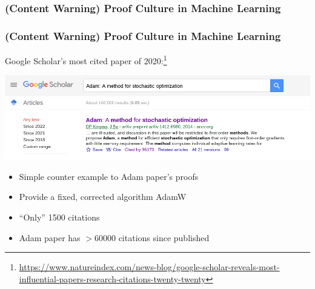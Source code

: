 \begin{frame}
\frametitle{(Content Warning) Proof Culture in Machine Learning}
\pause
{}
\end{frame}


\begin{frame}
\frametitle{(Content Warning) Proof Culture in Machine Learning}

Google Scholar's most cited paper of 2020:\footnote{
    \tiny\url{https://www.natureindex.com/news-blog/google-scholar-reveals-most-influential-papers-research-citations-twenty-twenty}
}

\vspace{0.1in}
\includegraphics[width=\textwidth]{img/adam}

\pause
\citet{reddi2019convergence}
\begin{itemize}
\item
    Simple counter example to Adam paper's proofs
\item
    Provide a fixed, corrected algorithm AdamW
\item
    ``Only'' 1500 citations
\item
    Adam paper has $>60000$ citations since \citet{reddi2019convergence} published
\end{itemize}
\end{frame}

